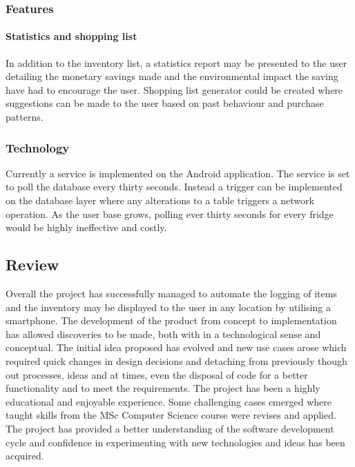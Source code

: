 \documentclass[a4paper, 11pt]{article}
\begin{document}
\subsubsection{Features}
\paragraph{Statistics and shopping list}
In addition to the inventory list, a statistics report may be presented to the user detailing the monetary savings made and the environmental impact the saving have had to encourage the user. Shopping list generator could be created where suggestions can be made to the user based on past behaviour and purchase patterns. 

\subsubsection{Technology}
Currently a service is implemented on the Android application. The service is set to poll the database every thirty seconds. Instead a trigger can be implemented on the database layer where any alterations to a table triggers a network operation. As the user base grows, polling ever thirty seconds for every fridge would be highly ineffective and costly.  

\subsection{Review}
Overall the project has successfully managed to automate the logging of items and the inventory may be displayed to the user in any location by utilising a smartphone. The development of the product from concept to implementation has allowed discoveries to be made, both with in a technological sense and conceptual. The initial idea proposed has evolved and new use cases arose which required quick changes in design decisions and detaching from previously though out processes, ideas and at times, even the disposal of code for a better functionality and to meet the requirements. 
The project has been a highly educational and enjoyable experience. Some challenging cases emerged where taught skills from the MSc Computer Science course were revises and applied. The project has provided a better understanding of the software development cycle and confidence in experimenting with new technologies and ideas has been acquired.    

\vspace{\baselineskip}
\vspace{\baselineskip}
\vspace{\baselineskip}
\end{document}

